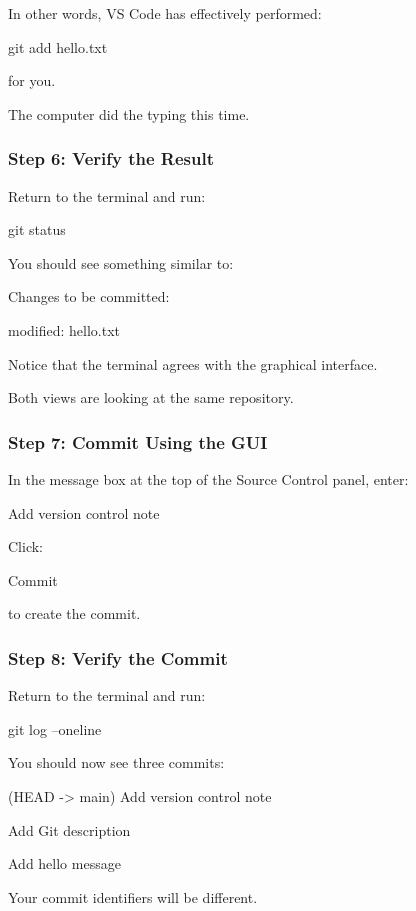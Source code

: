 \documentclass{csc2059practical}
\begin{document}
In other words, VS Code has effectively performed:

\begin{terminalplain}
git add hello.txt
\end{terminalplain}
for you.

The computer did the typing this time.

\subsubsection{Step 6: Verify the Result}
Return to the terminal and run:

\begin{terminalplain}
git status
\end{terminalplain}
You should see something similar to:

\begin{terminalplain}
Changes to be committed:
\end{terminalplain}
\begin{terminalplain}
modified: hello.txt
\end{terminalplain}
Notice that the terminal agrees with the graphical interface.

Both views are looking at the same repository.

\subsubsection{Step 7: Commit Using the GUI}
In the message box at the top of the Source Control panel, enter:

Add version control note

Click:

Commit

to create the commit.

\subsubsection{Step 8: Verify the Commit}
Return to the terminal and run:

\begin{terminalplain}
git log --oneline
\end{terminalplain}
You should now see three commits:

(HEAD -> main) Add version control note

Add Git description

Add hello message

Your commit identifiers will be different.
\end{document}
